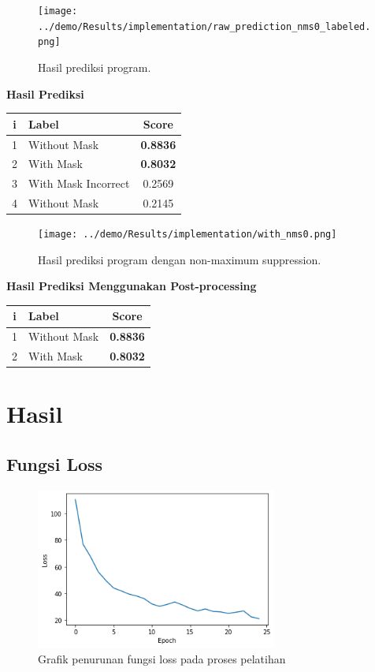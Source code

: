 \documentclass{article}
\begin{document}
	\begin{figure}[H]
		\centering
		\texttt{[image: ../demo/Results/implementation/raw\_prediction\_nms0\_labeled.png]}
		\caption{Hasil prediksi program.}
	\end{figure}
	{\large{\textbf{Hasil Prediksi}}}
	\begin{table}[H]
		\centering
		\begin{tabular}{clc}
		\hline
		\textbf{i} & \textbf{Label}               & \textbf{Score}  \\ \hline
		1 & Without Mask        & \textbf{0.8836} \\
		2 & With Mask           & \textbf{0.8032} \\
		3 & With Mask Incorrect & 0.2569 \\
		4 & Without Mask        & 0.2145
		\end{tabular}
	\end{table}
	\newpage
	
	\begin{figure}[H]
		\centering
		\texttt{[image: ../demo/Results/implementation/with\_nms0.png]}
		\caption{Hasil prediksi program dengan non-maximum suppression.}
  	\end{figure}
	{\large{\textbf{Hasil Prediksi Menggunakan Post-processing}}}
	\begin{table}[H]
		\centering
		\begin{tabular}{clc}
			\hline
			\textbf{i} & \textbf{Label}               & \textbf{Score}  \\ \hline
			1 & Without Mask        & \textbf{0.8836} \\
			2 & With Mask           & \textbf{0.8032} \\
		\end{tabular}
	\end{table}
	
  \newpage




  \section{Hasil}
  
  \subsection{Fungsi Loss}
  
  \begin{figure}[H]
  	\centering
  	\includegraphics[width=300px]{./images/grafik_loss.png}
  	\caption{Grafik penurunan fungsi loss pada proses pelatihan}
  \end{figure}
  
\end{document}

